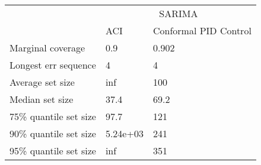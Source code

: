 \begin{tabular}{lll}
\toprule
& \multicolumn{2}{c}{SARIMA} \\
& ACI & Conformal PID Control \\
\midrule
Marginal coverage & 0.9 & 0.902 \\
Longest err sequence & 4 & 4 \\
Average set size & inf & 100 \\
Median set size & 37.4 & 69.2 \\
75\% quantile set size & 97.7 & 121 \\
90\% quantile set size & 5.24e+03 & 241 \\
95\% quantile set size & inf & 351 \\
\bottomrule
\end{tabular}
